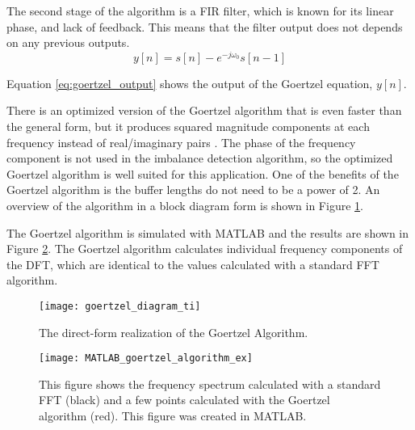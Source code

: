 The second stage of the algorithm is a FIR filter, which is known for its linear phase, and lack of feedback.  This means that the filter output does not depends on any previous outputs.
\begin{equation} \label{eq:goertzel_output}
	y[n] = s[n] - e^{-j\omega_0}s[n-1]
\end{equation}

Equation \ref{eq:goertzel_output} shows the output of the Goertzel equation, $y[n]$.

There is an optimized version of the Goertzel algorithm that is even faster than the general form, but it produces squared magnitude components at each frequency instead of real/imaginary pairs \cite{embedded_goertzel}.  The phase of the frequency component is not used in the imbalance detection algorithm, so the optimized Goertzel algorithm is well suited for this application.  One of the benefits of the Goertzel algorithm is the buffer lengths do not need to be a power of 2.  An overview of the algorithm in a block diagram form is shown in Figure \ref{fig:goertzel_diagram_ti}.

The Goertzel algorithm is simulated with MATLAB and the results are shown in Figure \ref{fig:MATLAB_goertzel_algorithm_ex}.  The Goertzel algorithm calculates individual frequency components of the DFT, which are identical to the values calculated with a standard FFT algorithm.

\begin{figure}
	\centering
	\texttt{[image: goertzel\_diagram\_ti]}
	\decoRule
	\caption{The direct-form realization of the Goertzel Algorithm\cite{TI_goertzel}.}
	\label{fig:goertzel_diagram_ti}
\end{figure}

\begin{figure}
	\centering
	\texttt{[image: MATLAB\_goertzel\_algorithm\_ex]}
	\decoRule
	\caption{This figure shows the frequency spectrum calculated with a standard FFT (black) and a few points calculated with the Goertzel algorithm (red).  This figure was created in MATLAB.}
	\label{fig:MATLAB_goertzel_algorithm_ex}
\end{figure}
